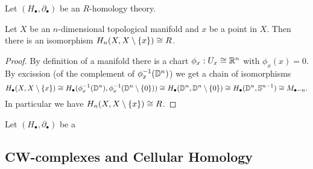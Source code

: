 	\begin{lemma}
		Let $(H_\bullet,\partial_\bullet)$ be an $R$-homology theory.

		Let $X$ be an $n$-dimensional topological manifold and $x$ be a point in $X$. Then there is an isomorphism $H_n(X,X\setminus \{x\}) \cong R$.
	\end{lemma}
	\begin{proof}
		By definition of a manifold there is a chart $\phi_x: U_x \cong \mathbb{R}^n$ with $\phi_x(x) = 0$. By excission (of the complement of $\phi_x^{-1}(\mathbb{D}^n)$) we get a chain of isomorphisms
		\begin{equation*}
			H_\bullet(X,X\setminus\{x\}) \cong H_\bullet(\phi_x^{-1}(\mathbb{D}^n),\phi_x^{-1}(\mathbb{D}^n\setminus \{0\})) \cong H_\bullet(\mathbb{D}^n,\mathbb{D}^n\setminus \{0\}) \cong H_\bullet(\mathbb{D}^n,\mathbb{S}^{n-1}) \cong M_{\bullet-n}.
		\end{equation*}
		In particular we have $H_n(X,X\setminus\{x\}) \cong R$. 
	\end{proof}

	\begin{definition}
		Let $(H_\bullet, \partial_\bullet)$ be a 
	\end{definition}

	\newpage
	\subsection{CW-complexes and Cellular Homology}

